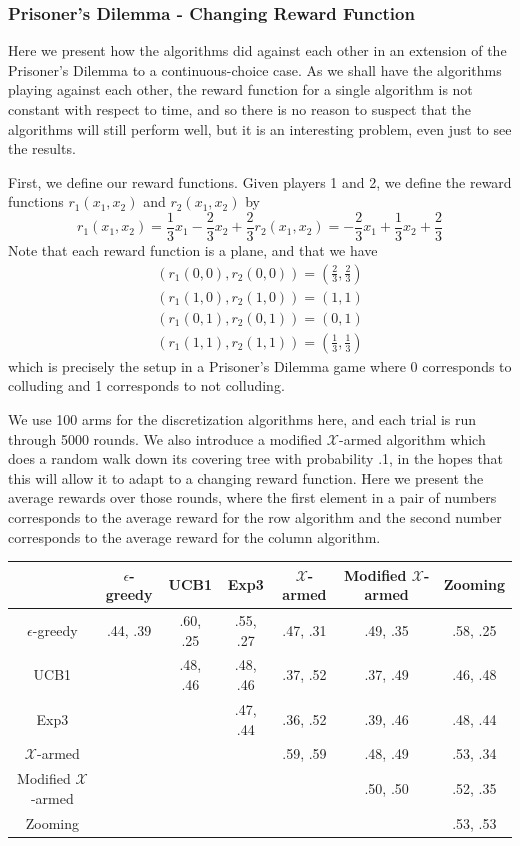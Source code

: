\subsubsection{Prisoner's Dilemma - Changing Reward Function}
Here we present how the algorithms did against each other in an extension of
the Prisoner's Dilemma to a continuous-choice case.  As we shall have the
algorithms playing against each other, the reward function for a single
algorithm is not constant with respect to time, and so there is no reason to
suspect that the algorithms will still perform well, but it is an interesting
problem, even just to see the results.

First, we define our reward functions.  Given players 1 and 2, we define the
reward functions $r_1(x_1, x_2)$ and $r_2(x_1, x_2)$ by
\[
	r_1(x_1, x_2) = \frac{1}{3} x_1 - \frac{2}{3} x_2 + \frac{2}{3}
	r_2(x_1, x_2) = -\frac{2}{3} x_1 + \frac{1}{3} x_2 + \frac{2}{3}
\]
Note that each reward function is a plane, and that we have
\begin{gather*}
	(r_1(0,0), r_2(0,0)) = \left(\frac{2}{3}, \frac{2}{3}\right) \\
	(r_1(1,0), r_2(1,0)) = (1, 1) \\
	(r_1(0,1), r_2(0,1)) = (0, 1) \\
	(r_1(1,1), r_2(1,1)) = \left(\frac{1}{3}, \frac{1}{3}\right)
\end{gather*}
which is precisely the setup in a Prisoner's Dilemma game where 0 corresponds
to colluding and 1 corresponds to not colluding.

We use 100 arms for the discretization algorithms here, and each trial is run
through 5000 rounds.  We also introduce a modified $\mathcal{X}$-armed
algorithm which does a random walk down its covering tree with probability .1,
in the hopes that this will allow it to adapt to a changing reward function.
Here we present the average rewards over those rounds, where the first element
in a pair of numbers corresponds to the average reward for the row algorithm
and the second number corresponds to the average reward for the column
algorithm.  

\begin{tabular}{|c|c|c|c|c|c|c|}
\hline
& $\epsilon$-greedy & UCB1 & Exp3 & $\mathcal{X}$-armed &
Modified $\mathcal{X}$-armed & Zooming \\ \hline
$\epsilon$-greedy & .44, .39 & .60, .25 & .55, .27 & .47, .31 & .49, .35 &
.58, .25\\ \hline
UCB1 & & .48, .46 & .48, .46 & .37, .52 & .37, .49  & .46, .48 \\ \hline
Exp3 & & & .47, .44 & .36, .52 & .39, .46 & .48, .44 \\ \hline
$\mathcal{X}$-armed & & & & .59, .59 & .48, .49 & .53, .34 \\ \hline
Modified $\mathcal{X}$-armed & & & & & .50, .50 & .52, .35 \\ \hline
Zooming & & & & & & .53, .53 \\ \hline
\end{tabular}

